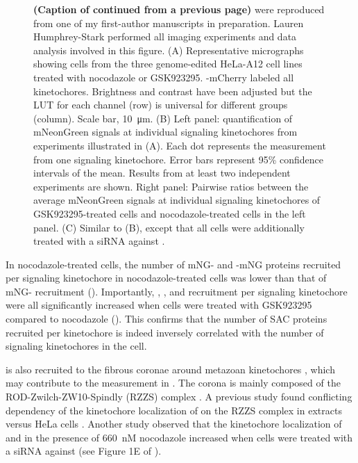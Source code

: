 \begin{figure} [t!]
    \noindent\justifying \textbf{(Caption of  continued from a previous page)}  were reproduced from one of my first-author manuscripts in preparation. Lauren Humphrey-Stark performed all imaging experiments and data analysis involved in this figure. (A) Representative micrographs showing cells from the three genome-edited HeLa-A12 cell lines treated with nocodazole or GSK923295. -mCherry labeled all kinetochores. Brightness and contrast have been adjusted but the LUT for each channel (row) is universal for different groups (column). Scale bar, \SI{10}{\micro m}. (B) Left panel: quantification of mNeonGreen signals at individual signaling kinetochores from experiments illustrated in (A). Each dot represents the measurement from one signaling kinetochore. Error bars represent 95\% confidence intervals of the mean. Results from at least two independent experiments are shown. Right panel: Pairwise ratios between the average mNeonGreen signals at individual signaling kinetochores of GSK923295-treated cells and nocodazole-treated cells in the left panel. (C) Similar to (B), except that all cells were additionally treated with a siRNA against .
\end{figure}

In nocodazole-treated cells, the number of mNG- and -mNG proteins recruited per signaling kinetochore in nocodazole-treated cells was lower than that of mNG- recruitment (). Importantly, , , and  recruitment per signaling kinetochore were all significantly increased when cells were treated with GSK923295 compared to nocodazole (). This confirms that the number of SAC proteins recruited per kinetochore is indeed inversely correlated with the number of signaling kinetochores in the cell.

 is also recruited to the fibrous coronae around metazoan kinetochores \cite{RZZ-MAD1vsBUB1-MAD1_2015, RZZ-MAD1vsBUB1-MAD1_2018}, which may contribute to the measurement in . The corona is mainly composed of the ROD-Zwilch-ZW10-Spindly (RZZS) complex \cite{RZZS_Sacristan2018}. A previous study found conflicting dependency of the kinetochore localization of  on the RZZS complex in  extracts versus HeLa cells \cite{BUBR1_XenopusVSHeLa}. Another study observed that the kinetochore localization of  and  in the presence of \SI{660}{nM} nocodazole increased when cells were treated with a siRNA against  (see Figure 1E of \cite{siROD_Zhang2019}).

